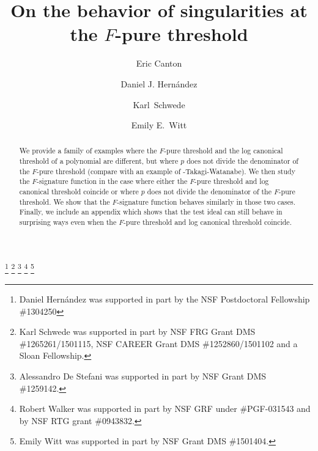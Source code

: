 \documentclass[11pt]{amsart}
\begin{document}

\title[Behavior at the $F$-pure threshold]{On the behavior of singularities at the $F$-pure threshold}

\thanks{Daniel Hern\'andez was supported in part by the NSF Postdoctoral Fellowship \#1304250}
\thanks{Karl Schwede was supported in part by NSF FRG Grant DMS \#1265261/1501115, NSF CAREER Grant DMS \#1252860/1501102 and a Sloan Fellowship.}
\thanks{Alessandro De Stefani was supported in part by NSF Grant DMS \#1259142.}
\thanks{Robert Walker was supported in part by NSF GRF under \#PGF-031543 and by NSF RTG grant
\#0943832.}
\thanks{Emily Witt was supported in part by NSF Grant DMS \#1501404.}

\begin{abstract}
We provide a family of examples where the $F$-pure threshold and the log canonical threshold of a polynomial are different, but where $p$ does not divide the denominator of the $F$-pure threshold (compare with an example of \mustata-Takagi-Watanabe).  We then study the $F$-signature function in the case where either the $F$-pure threshold and log canonical threshold coincide or where $p$ does not divide the denominator of the $F$-pure threshold.  We show that the $F$-signature function behaves similarly in those two cases.  Finally, we include an appendix which shows that the test ideal can still behave in surprising ways even when the $F$-pure threshold and log canonical threshold coincide.
 \end{abstract}

\author[E.~Canton]{Eric Canton}
\address{Department of Mathematics,
University of Nebraska--Lincoln,
203 Avery Hall,
Lincoln, NE  68588}

\author[D.~Hern\'andez]{Daniel J. Hern\'andez}
\address{Department of Mathematics,
University of Utah,
155 S 1400 E,
Salt Lake City, Utah 84112}

\author[K.~Schwede]{Karl~Schwede}
\address{Department of Mathematics,
University of Utah,
155 S 1400 E,
Salt Lake City, Utah 84112}

\author[E.~Witt]{Emily E.~Witt}
\address{Department of Mathematics,
University of Utah,
155 S 1400 E,
Salt Lake City, Utah 84112}

\address{P. O. Box 400137,
Dept. of Mathematics,
University of Virginia,
319 Kerchof Hall,
Charlottesville, VA 22904}
\end{document}
